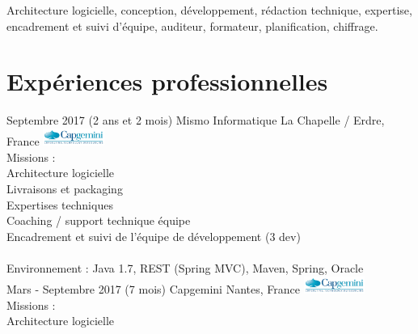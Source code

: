 \documentclass[]{cv-style}          %
\begin{document}
Architecture logicielle, conception, développement, rédaction technique, expertise, encadrement et suivi d'équipe, auditeur, formateur, planification, chiffrage.


\section{Expériences professionnelles}
  \vspace{-0.2cm}
\begin{entrylist}
\entry
  {Septembre 2017 (2 ans et 2 mois)}
  {Mismo Informatique}
  {La Chapelle / Erdre, France}
  {\hfill\includegraphics[width=2cm]{capgemini.jpg}\\
Missions :\\
\hspace{0.6cm}Architecture logicielle\\
\hspace{0.6cm}Livraisons et packaging\\
\hspace{0.6cm}Expertises techniques\\
\hspace{0.6cm}Coaching / support technique équipe\\
\hspace{0.6cm}Encadrement et suivi de l'équipe de développement (3 dev)\\
\\
Environnement : Java 1.7, REST (Spring MVC), Maven, Spring, Oracle\\
}
\entry
  {Mars - Septembre 2017 (7 mois)}
  {Capgemini}
  {Nantes, France}
  {\hfill\includegraphics[width=2cm]{capgemini.jpg}\\
Missions :\\
\hspace{0.6cm}Architecture logicielle\\
}
\end{entrylist}
\end{document}
